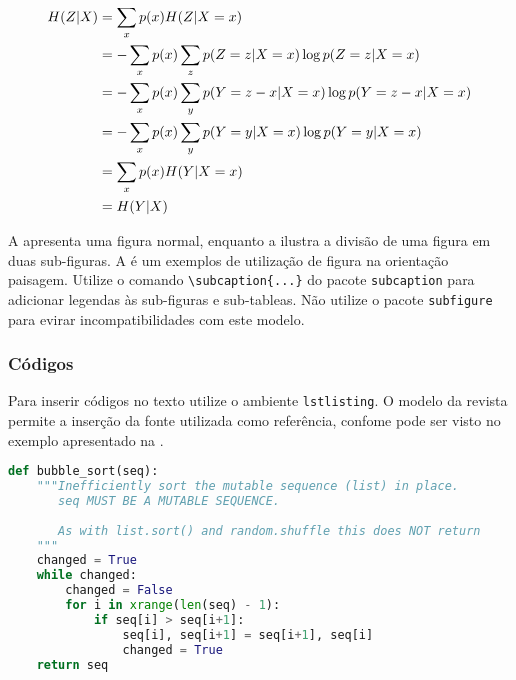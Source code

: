 \documentclass[portuguese]{textolivre}
\begin{document}
\begin{subequations}
\allowdisplaybreaks
\begin{align}
H(Z|X) &= \sum_x p(x) H(Z|X=x) \label{eq-align-ex1} \\
       &= - \sum_x p(x) \sum_z p(Z=z|X=x) \log p(Z=z|X=x) \label{eq-align-ex2}\\
       &= - \sum_x p(x) \sum_y p(Y=z-x|X=x) \log p(Y=z-x|X=x) \label{eq-align-ex3} \\
       &= - \sum_x p(x) \sum_y p(Y=y|X=x) \log p(Y=y|X=x) \label{eq-align-ex4} \\
       &= \sum_x p(x) H(Y|X=x) \label{eq-align-ex5} \\
       &= H(Y|X) \label{eq-align-ex6}
\end{align}
\end{subequations}

A  apresenta uma figura normal, enquanto 
a  ilustra a divisão de uma figura em duas sub-figuras. 
A  é um exemplos de utilização de figura na orientação paisagem.
Utilize o comando \verb|\subcaption{...}| do pacote \texttt{subcaption} para adicionar legendas 
às sub-figuras e sub-tableas. Não utilize o pacote \texttt{subfigure} para evirar incompatibilidades com este modelo.

\lipsum[10-14]

\subsubsection{Códigos}\label{sec-codigos}
Para inserir códigos no texto utilize o ambiente \texttt{lstlisting}. 
O modelo da revista permite a inserção da fonte utilizada como referência, confome 
pode ser visto no exemplo apresentado na .
 
\begin{lstlisting}[language=python, label=lst-code, caption={\emph{Bubble sort}, ou ordenação por flutuação.}, source={Rosetta Code (\url{https://rosettacode.org/wiki/Sorting_algorithms/Bubble_sort}).}]
def bubble_sort(seq):
    """Inefficiently sort the mutable sequence (list) in place.
       seq MUST BE A MUTABLE SEQUENCE.
 
       As with list.sort() and random.shuffle this does NOT return 
    """
    changed = True
    while changed:
        changed = False
        for i in xrange(len(seq) - 1):
            if seq[i] > seq[i+1]:
                seq[i], seq[i+1] = seq[i+1], seq[i]
                changed = True
    return seq
\end{lstlisting} %
\end{document}
